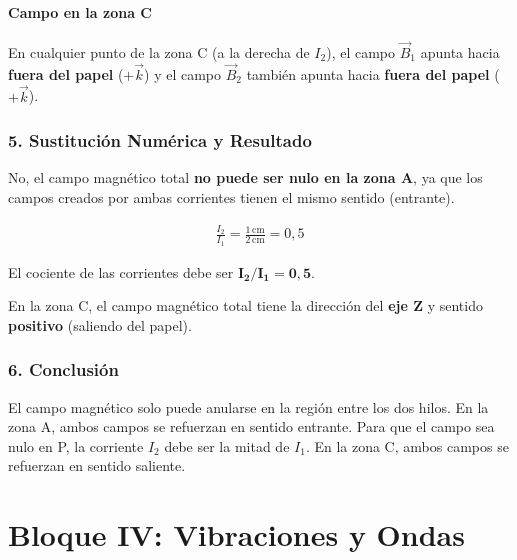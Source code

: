 \paragraph*{Campo en la zona C}
En cualquier punto de la zona C (a la derecha de $I_2$), el campo $\vec{B}_1$ apunta hacia \textbf{fuera del papel} ($+\vec{k}$) y el campo $\vec{B}_2$ también apunta hacia \textbf{fuera del papel} ($+\vec{k}$).

\subsubsection*{5. Sustitución Numérica y Resultado}
\begin{cajaresultado}
    No, el campo magnético total \textbf{no puede ser nulo en la zona A}, ya que los campos creados por ambas corrientes tienen el mismo sentido (entrante).
\end{cajaresultado}
\begin{gather}
    \frac{I_2}{I_1} = \frac{1 \, \text{cm}}{2 \, \text{cm}} = 0,5
\end{gather}
\begin{cajaresultado}
    El cociente de las corrientes debe ser $\boldsymbol{I_2/I_1 = 0,5}$.
\end{cajaresultado}
\begin{cajaresultado}
    En la zona C, el campo magnético total tiene la dirección del \textbf{eje Z} y sentido \textbf{positivo} (saliendo del papel).
\end{cajaresultado}

\subsubsection*{6. Conclusión}
\begin{cajaconclusion}
    El campo magnético solo puede anularse en la región entre los dos hilos. En la zona A, ambos campos se refuerzan en sentido entrante. Para que el campo sea nulo en P, la corriente $I_2$ debe ser la mitad de $I_1$. En la zona C, ambos campos se refuerzan en sentido saliente.
\end{cajaconclusion}

\newpage

\section{Bloque IV: Vibraciones y Ondas}
\label{sec:ondas_2025_jun_res}
